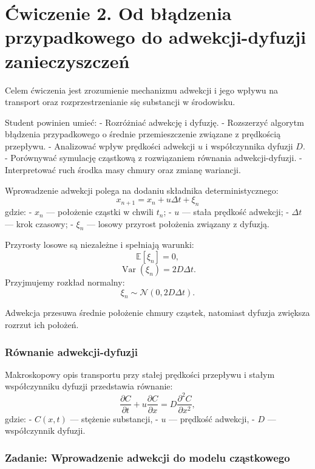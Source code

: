 \documentclass[
  polish,
  letterpaper,
  DIV=11,
  numbers=noendperiod]{scrartcl}
\begin{document}
\section{Ćwiczenie 2. Od błądzenia przypadkowego do adwekcji-dyfuzji
zanieczyszczeń}\label{ux107wiczenie-2.-od-bux142ux105dzenia-przypadkowego-do-adwekcji-dyfuzji-zanieczyszczeux144}

Celem ćwiczenia jest zrozumienie mechanizmu adwekcji i jego wpływu na
transport oraz rozprzestrzenianie się substancji w środowisku.

Student powinien umieć: - Rozróżniać adwekcję i dyfuzję. - Rozszerzyć
algorytm błądzenia przypadkowego o średnie przemieszczenie związane z
prędkością przepływu. - Analizować wpływ prędkości adwekcji \(u\) i
współczynnika dyfuzji \(D\). - Porównywać symulację cząstkową z
rozwiązaniem równania adwekcji-dyfuzji. - Interpretować ruch środka masy
chmury oraz zmianę wariancji.

Wprowadzenie adwekcji polega na dodaniu składnika deterministycznego: \[
{x_{n+1}=x_n+u\Delta t+\xi_n}
\] gdzie: - \(x_n\) --- położenie cząstki w chwili \(t_n\); - \(u\) ---
stała prędkość adwekcji; - \(\Delta t\) --- krok czasowy; - \(\xi_n\)
--- losowy przyrost położenia związany z dyfuzją.

Przyrosty losowe są niezależne i spełniają warunki:
\[\mathbb{E}[\xi_n]=0,\] \[
\operatorname{Var}(\xi_n)=2D\Delta t.
\] Przyjmujemy rozkład normalny: \[
\xi_n\sim\mathcal{N}(0,2D\Delta t).
\]

Adwekcja przesuwa średnie położenie chmury cząstek, natomiast dyfuzja
zwiększa rozrzut ich położeń.

\subsubsection{Równanie
adwekcji-dyfuzji}\label{ruxf3wnanie-adwekcji-dyfuzji}

Makroskopowy opis transportu przy stałej prędkości przepływu i stałym
współczynniku dyfuzji przedstawia równanie: \[
\frac{\partial C}{\partial t} + u\frac{\partial C}{\partial x} =D\frac{\partial^2 C}{\partial x^2},
\] gdzie: - \(C(x,t)\) --- stężenie substancji, - \(u\) --- prędkość
adwekcji, - \(D\) --- współczynnik dyfuzji.

\subsubsection{Zadanie: Wprowadzenie adwekcji do modelu
cząstkowego}\label{zadanie-wprowadzenie-adwekcji-do-modelu-czux105stkowego}
\end{document}
